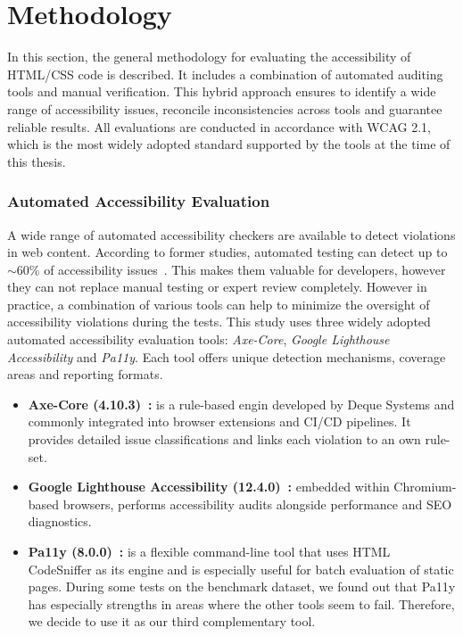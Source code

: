 \chapter{Methodology}\label{chapter:Methodology}

In this section, the general methodology for evaluating the 
accessibility of HTML/CSS code is described. It includes a combination
of automated auditing tools and manual verification. This hybrid
approach ensures to identify a wide range of accessibility issues,
reconcile inconsistencies across tools and guarantee 
reliable results. All evaluations are conducted in accordance
with WCAG 2.1, which is the most widely adopted standard 
supported by the tools at the time of this thesis.

\subsection{Automated Accessibility Evaluation}
A wide range of automated accessibility checkers are available to 
detect violations in web content.
According to former studies, automated testing can detect up to $\sim$60\% 
of accessibility issues~\cite{deque2023accessibility}. This makes them 
valuable for developers, however they can not replace manual testing or 
expert review completely.
However in practice, a combination of various tools can help to minimize the 
oversight of accessibility violations during the tests.\newline
This study uses three widely adopted automated accessibility evaluation 
tools: \textit{Axe-Core}, \textit{Google Lighthouse Accessibility} 
and \textit{Pa11y}. Each tool offers unique detection mechanisms,
coverage areas and reporting formats.
\begin{itemize}
  \item \textbf{Axe-Core (4.10.3)~\cite{web:axecore}:} is a rule-based engin
  developed by Deque Systems and commonly integrated into browser 
  extensions and CI/CD pipelines. It provides detailed issue classifications 
  and links each violation to an own rule-set.
  \item \textbf{Google Lighthouse Accessibility (12.4.0)~\cite{web:lighthouse}:} 
  embedded within Chromium-based browsers, performs accessibility audits
  alongside performance and SEO diagnostics.
  \item \textbf{Pa11y (8.0.0)~\cite{web:pa11y}:} is a flexible command-line tool 
  that uses HTML CodeSniffer as its engine and is especially useful for batch 
  evaluation of static pages. During some tests on the benchmark dataset, we 
  found out that Pa11y has especially strengths in areas where the other tools
  seem to fail. Therefore, we decide to use it as our third complementary tool.
\end{itemize}
 

